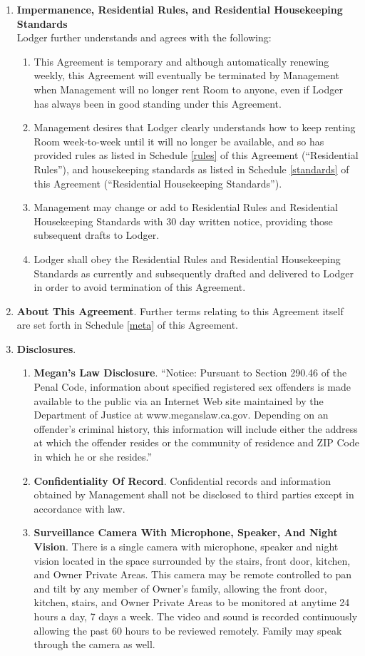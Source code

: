 \documentclass[]{article}
\newcommand{\rules}{Residential Rules}
\newcommand{\standards}{Residential Housekeeping Standards}
\newcommand{\meta}{About This Agreement}
\newcommand{\management}{Management}
\newcommand{\room}{Room}
\newcommand{\livingroom}{Owner Private Areas}
\begin{document}
\begin{enumerate}
		\item \textbf{Impermanence, \rules{}, and \standards{}}\\
			Lodger further understands and agrees with the following: 
			\begin{enumerate}
				\item This Agreement is temporary and although automatically renewing weekly, this Agreement will eventually be terminated by \management{} when \management{} will no longer rent \room{} to anyone, even if Lodger has always been in good standing under this Agreement. 
				\item \management{} desires that Lodger clearly understands how to keep renting \room{} week-to-week until it will no longer be available, and so has provided rules as listed in Schedule \ref{rules} of this Agreement (``\rules{}''), and housekeeping standards as listed in Schedule \ref{standards} of this Agreement (``\standards{}''). 
				\item \management{} may change or add to \rules{} and \standards{} with 30 day written notice, providing those subsequent drafts to Lodger.
				\item Lodger shall obey the \rules{} and \standards{} as currently and subsequently drafted and delivered to Lodger in order to avoid termination of this Agreement.
			\end{enumerate}

		\item \textbf{\meta{}}.
			Further terms relating to this Agreement itself are set forth in Schedule \ref{meta} of this Agreement.

		\item \textbf{Disclosures}. 
			\begin{enumerate}
				\item \textbf{Megan's Law Disclosure}.
					``Notice: Pursuant to Section 290.46 of the Penal Code, information about specified registered sex offenders is made available to the public via an Internet Web site maintained by the Department of Justice at www.meganslaw.ca.gov. Depending on an offender's criminal history, this information will include either the address at which the offender resides or the community of residence and ZIP Code in which he or she resides.''
				\item \textbf{Confidentiality Of Record}. 
					Confidential records and information obtained by \management{} shall not be disclosed to third parties except in accordance with law. 
				\item \textbf{Surveillance Camera With Microphone, Speaker, And Night Vision}. There is a single camera with microphone, speaker and night vision located in the space surrounded by the stairs, front door, kitchen, and \livingroom{}. This camera may be remote controlled to pan and tilt by any member of Owner's family, allowing the front door, kitchen, stairs, and \livingroom{} to be monitored at anytime 24 hours a day, 7 days a week. The video and sound is recorded continuously allowing the past 60 hours to be reviewed remotely. Family may speak through the camera as well.
			\end{enumerate}


\end{enumerate}
\end{document}
